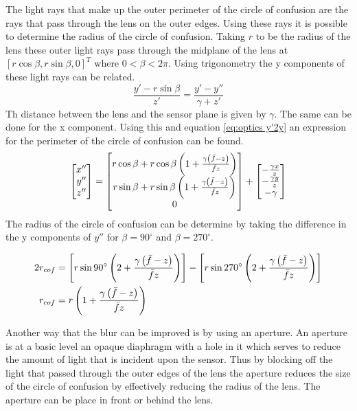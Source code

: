 \documentclass[[12pt,oneside,openany,a4paper, %
\newcommand*\mean[1]{\bar{#1}} %
\begin{document}
The light rays that make up the outer perimeter of the circle of confusion are the rays that pass through the lens on the outer edges. Using these rays it is possible to determine the radius of the circle of confusion. Taking $r$ to be the radius of the lens these outer light rays pass through the midplane of the lens at $[r \cos \beta, r \sin \beta, 0]^T$ where $0<\beta<2\pi$. Using trigonometry the y components of these light rays can be related.
\begin{equation}
  \frac{y' - r \sin \beta}{z'}= \frac{y' - y''}{\gamma + z'}
\end{equation}
Th distance between the lens and the sensor plane is given by $\gamma$. The same can be done for the x component. Using this and equation \ref{eq:optics y'2y} an expression for the perimeter of the circle of confusion can be found.
\begin{equation}
\label{eq:cof}
  \begin{bmatrix}
  x'' \\
  y'' \\
  z''
  \end{bmatrix} =
  \begin{bmatrix}
  r \cos \beta + r \cos \beta \left( 1 + \frac{\gamma \left( \mean{f} - z \right)}{\mean{f} z} \right) \\
  r \sin \beta + r \sin \beta \left( 1 + \frac{\gamma \left( \mean{f} - z \right)}{\mean{f} z} \right) \\
  0
  \end{bmatrix} +
  \begin{bmatrix}
  -\frac{\gamma x}{z} \\
  -\frac{\gamma y}{z} \\
  - \gamma
  \end{bmatrix}
\end{equation}
The radius of the circle of confusion can be determine by taking the difference in the y components of $y''$ for $\beta=90 ^{\circ} $ and $\beta=270 ^{\circ}$.

\begin{align}
  2 r_{cof} &= \left[r \sin 90 ^{\circ} \left( 2 + \frac{\gamma \left( \mean{f} - z \right)}{\mean{f} z} \right) \right] - \left[r \sin 270 ^{\circ} \left( 2 + \frac{\gamma \left( \mean{f} - z \right)}{\mean{f} z} \right) \right] \\
  r_{cof}&=r \left( 1 + \frac{\gamma \left( \mean{f} - z \right)}{\mean{f}z} \right)
\end{align}

Another way that the blur can be improved is by using an aperture. An aperture is at a basic level an opaque diaphragm with a hole in it which serves to reduce the amount of light that is incident upon the sensor. Thus by blocking off the light that passed through the outer edges of the lens the aperture reduces the size of the circle of confusion by effectively reducing the radius of the lens. The aperture can be place in front or behind the lens. 
\end{document}
